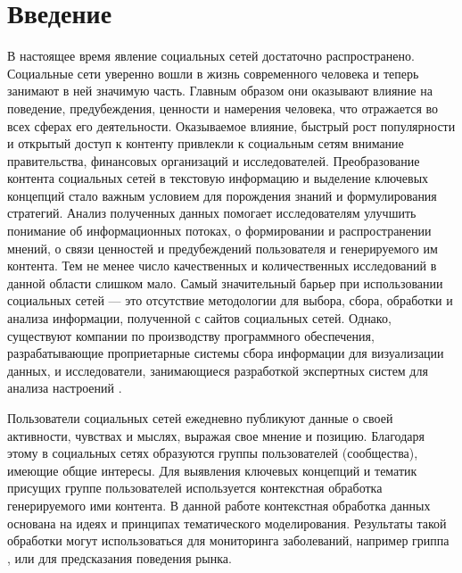 \documentclass[a4paper]{report}
\begin{document}
	\section{Введение} 
	В настоящее время явление социальных сетей достаточно распространено. Социальные сети уверенно вошли в жизнь современного человека и теперь занимают в ней значимую часть. Главным образом они оказывают влияние на поведение, предубеждения, ценности и намерения человека, что отражается во всех сферах его деятельности. Оказываемое влияние, быстрый рост популярности и открытый доступ к контенту привлекли к социальным сетям внимание правительства, финансовых организаций и исследователей. Преобразование контента социальных сетей в текстовую информацию и выделение ключевых концепций стало важным условием для порождения знаний и формулирования стратегий. Анализ полученных данных помогает исследователям улучшить понимание об информационных потоках, о формировании и распространении мнений, о связи ценностей и предубеждений пользователя и генерируемого им контента. Тем не менее число качественных и количественных исследований в данной области слишком мало. Самый значительный барьер при использовании социальных сетей --- это отсутствие методологии для выбора, сбора, обработки и анализа информации, полученной с сайтов социальных сетей. Однако, существуют компании по производству программного обеспечения, разрабатывающие проприетарные системы сбора информации для визуализации данных, и исследователи, занимающиеся разработкой экспертных систем для анализа настроений \cite{bib:Kaklauskas}. 
	
Пользователи социальных сетей ежедневно публикуют данные о своей активности, чувствах и мыслях, выражая свое мнение и позицию. Благодаря этому в социальных сетях образуются группы пользователей (сообщества), имеющие общие интересы. Для выявления ключевых концепций и тематик присущих группе пользователей используется контекстная обработка  генерируемого ими контента. В данной работе контекстная обработка данных основана на идеях и принципах тематического моделирования. Результаты такой обработки могут использоваться для мониторинга заболеваний, например гриппа \cite{bib:Paul}, или для предсказания поведения рынка. \\

	 
\end{document}
